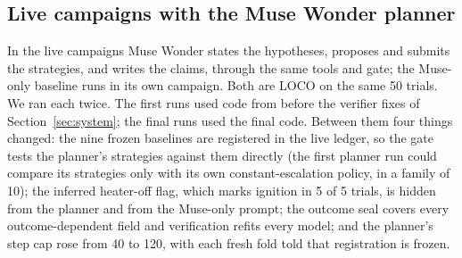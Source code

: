 \documentclass[11pt]{article}
\begin{document}
\subsection{Live campaigns with the Muse Wonder planner}\label{sec:live}
In the live campaigns Muse Wonder states the hypotheses, proposes and submits the strategies, and writes the claims,
through the same tools and gate; the Muse-only baseline runs in its own campaign. Both are LOCO on the same 50
trials. We ran each twice. The first runs used code from before the verifier fixes of Section~\ref{sec:system}; the
final runs used the final code. Between them four things changed: the nine frozen baselines are registered in the
live ledger, so the gate tests the planner's strategies against them directly (the first planner run could compare
its strategies only with its own constant-escalation policy, in a family of 10); the inferred heater-off flag, which
marks ignition in 5 of 5 trials, is hidden from the planner and from the Muse-only prompt; the outcome seal covers
every outcome-dependent field and verification refits every model; and the planner's step cap rose from 40 to 120,
with each fresh fold told that registration is frozen.
\end{document}

